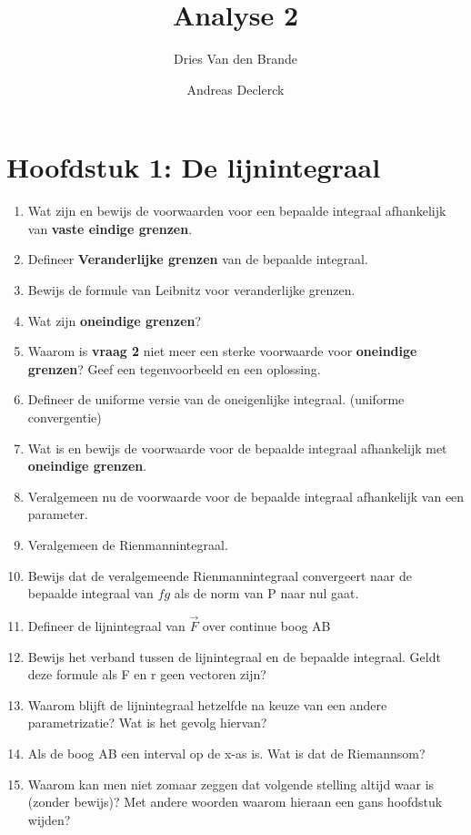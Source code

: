 \documentclass[12pt]{article}
\begin{document}
    \title{Analyse 2}
    \author{Dries Van den Brande \and Andreas Declerck}

    \maketitle
    \section*{Hoofdstuk 1: De lijnintegraal}
    \begin{enumerate}
        \item Wat zijn en bewijs de voorwaarden voor een bepaalde integraal afhankelijk van \textbf{vaste eindige grenzen}.
        \item Defineer \textbf{Veranderlijke grenzen} van de bepaalde integraal.
        \item Bewijs de formule van Leibnitz voor veranderlijke grenzen.
        \item Wat zijn \textbf{oneindige grenzen}?
        \item Waarom is \textbf{vraag 2} niet meer een sterke voorwaarde voor \textbf{oneindige grenzen}? Geef een tegenvoorbeeld en een oplossing.
        \item Defineer de uniforme versie van de oneigenlijke integraal. (uniforme convergentie)
        \item Wat is en bewijs de voorwaarde voor de bepaalde integraal afhankelijk met \textbf{oneindige grenzen}.
        \item Veralgemeen nu de voorwaarde voor de bepaalde integraal afhankelijk van een parameter.
        \item Veralgemeen de Rienmannintegraal.
        \item Bewijs dat de veralgemeende Rienmannintegraal convergeert naar de bepaalde integraal van $fg$ als de norm van P naar nul gaat.
        \item Defineer de lijnintegraal van $\vec{F}$ over continue boog AB
        \item Bewijs het verband tussen de lijnintegraal en de bepaalde integraal. Geldt deze formule als F en r geen vectoren zijn?
        \item Waarom blijft de lijnintegraal hetzelfde na keuze van een andere parametrizatie? Wat is het gevolg hiervan?
        \item Als de boog AB een interval op de x-as is. Wat is dat de Riemannsom?
        \item Waarom kan men niet zomaar zeggen dat volgende stelling altijd waar is (zonder bewijs)? Met andere woorden waarom hieraan een gans hoofdstuk wijden?

\end{enumerate}
\end{document}
